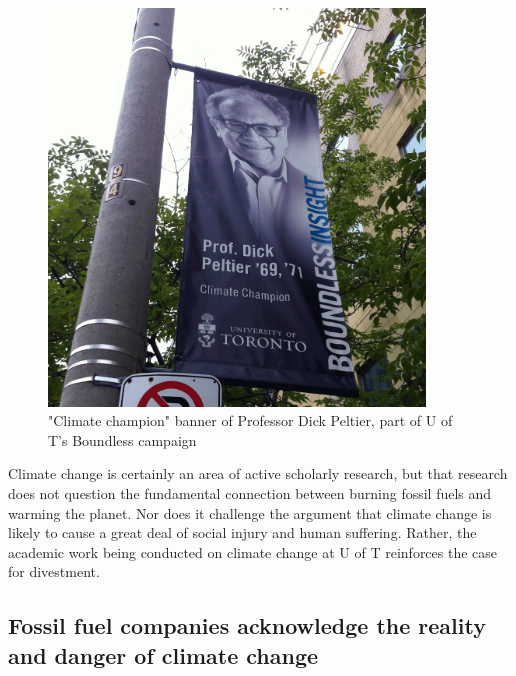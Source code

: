 \documentclass[10pt]{article}
\begin{document}
\begin{figure}[h]
\includegraphics[width=100mm]{s2-peltier.png}
\centering
\caption{"Climate champion" banner of Professor Dick Peltier, part of U of T's Boundless campaign}
\label{fig:s2-peltier}
\end{figure}



Climate change is certainly an area of active scholarly research, but that research does not question the fundamental connection between burning fossil fuels and warming the planet. 
Nor does it challenge the argument that climate change is likely to cause a great deal of social injury and human suffering.
Rather, the academic work being conducted on climate change at U of T reinforces the case for divestment.



	\subsection{Fossil fuel companies acknowledge the reality and danger of climate change}




	
\end{document}
